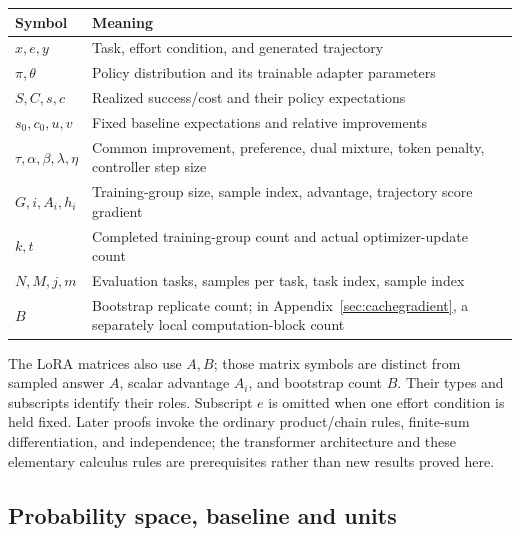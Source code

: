 \documentclass[11pt]{article}
\begin{document}
\begin{center}
\small
\begin{tabularx}{\linewidth}{@{}lX@{}}
\toprule
Symbol & Meaning \\
\midrule
$x,e,y$ & Task, effort condition, and generated trajectory \\
$\pi,\theta$ & Policy distribution and its trainable adapter parameters \\
$S,C,s,c$ & Realized success/cost and their policy expectations \\
$s_0,c_0,u,v$ & Fixed baseline expectations and relative improvements \\
$\tau,\alpha,\beta,\lambda,\eta$ & Common improvement, preference, dual mixture, token penalty, controller step size \\
$G,i,A_i,h_i$ & Training-group size, sample index, advantage, trajectory score gradient \\
$k,t$ & Completed training-group count and actual optimizer-update count \\
$N,M,j,m$ & Evaluation tasks, samples per task, task index, sample index \\
$B$ & Bootstrap replicate count; in Appendix~\ref{sec:cachegradient}, a separately local computation-block count \\
\bottomrule
\end{tabularx}
\end{center}
The LoRA matrices also use $A,B$; those matrix symbols are distinct from sampled answer $A$, scalar advantage $A_i$, and bootstrap count $B$. Their types and subscripts identify their roles. Subscript $e$ is omitted when one effort condition is held fixed. Later proofs invoke the ordinary product/chain rules, finite-sum differentiation, and independence; the transformer architecture and these elementary calculus rules are prerequisites rather than new results proved here.

\subsection{Probability space, baseline and units}
\end{document}
